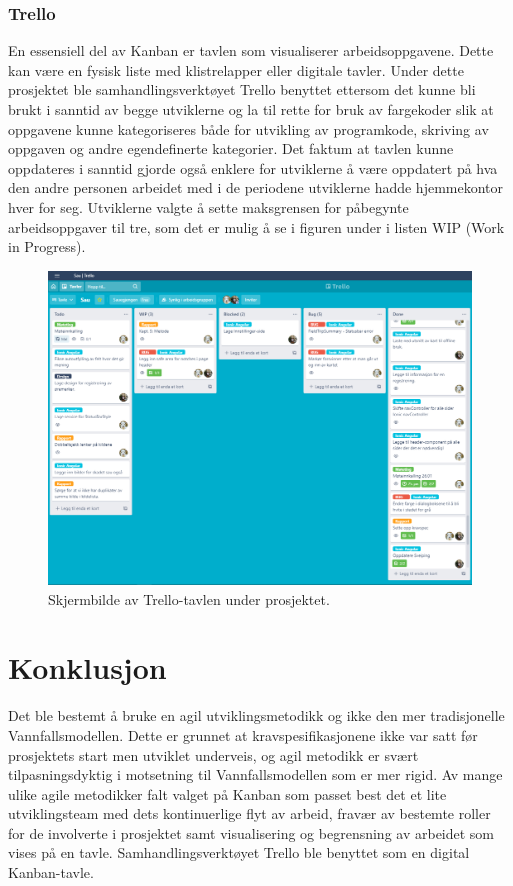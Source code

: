 \subsubsection{Trello}
En essensiell del av Kanban er tavlen som visualiserer arbeidsoppgavene. Dette kan være en fysisk liste med klistrelapper eller digitale tavler. Under dette prosjektet ble samhandlingsverktøyet Trello \cite{Trello} benyttet ettersom det kunne bli brukt i sanntid av begge utviklerne og la til rette for bruk av fargekoder slik at oppgavene kunne kategoriseres både for utvikling av programkode, skriving av oppgaven og andre egendefinerte kategorier. Det faktum at tavlen kunne oppdateres i sanntid gjorde også enklere for utviklerne å være oppdatert på hva den andre personen arbeidet med i de periodene utviklerne hadde hjemmekontor hver for seg. Utviklerne valgte å sette maksgrensen for påbegynte arbeidsoppgaver til tre, som det er mulig å se i figuren under i listen WIP (Work in Progress). 
\begin{figure}[H]
\centering
\captionsetup{width=.8\linewidth}
\includegraphics[scale=0.4]{Figurer/Bilder/trello.png}
\caption{Skjermbilde av Trello-tavlen under prosjektet.}
\label{fig:trello}
\end{figure}

\section{Konklusjon}
Det ble bestemt å bruke en agil utviklingsmetodikk og ikke den mer tradisjonelle Vannfallsmodellen. Dette er grunnet at kravspesifikasjonene ikke var satt før prosjektets start men utviklet underveis, og agil metodikk er svært tilpasningsdyktig i motsetning til Vannfallsmodellen som er mer rigid. Av mange ulike agile metodikker falt valget på Kanban som passet best det et lite utviklingsteam med dets kontinuerlige flyt av arbeid, fravær av bestemte roller for de involverte i prosjektet samt visualisering og begrensning av arbeidet som vises på en tavle.  Samhandlingsverktøyet Trello ble benyttet som en digital Kanban-tavle.